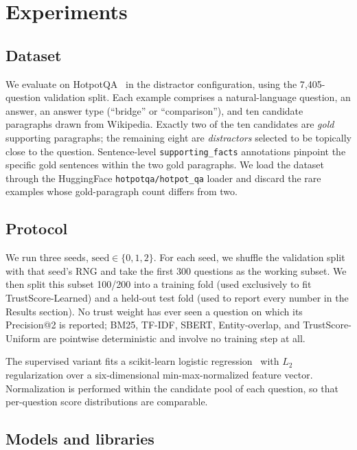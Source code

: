 \section{Experiments}
\label{sec:experiments}

\subsection{Dataset}

We evaluate on HotpotQA~\cite{yang2018hotpotqa} in the distractor
configuration, using the 7{,}405-question validation split. Each
example comprises a natural-language question, an answer, an answer
type (``bridge'' or ``comparison''), and ten candidate paragraphs drawn
from Wikipedia. Exactly two of the ten candidates are \emph{gold}
supporting paragraphs; the remaining eight are \emph{distractors}
selected to be topically close to the question. Sentence-level
\texttt{supporting\_facts} annotations pinpoint the specific gold
sentences within the two gold paragraphs. We load the dataset through
the HuggingFace \texttt{hotpotqa/hotpot\_qa} loader and discard the
rare examples whose gold-paragraph count differs from two.

\subsection{Protocol}

We run three seeds, $\text{seed}\in\{0,1,2\}$. For each seed, we
shuffle the validation split with that seed's RNG and take the first
300 questions as the working subset. We then split this subset
100/200 into a training fold (used exclusively to fit
TrustScore-Learned) and a held-out test fold (used to report every
number in the Results section). No trust weight has ever seen a
question on which its Precision@2 is reported; BM25, TF-IDF, SBERT,
Entity-overlap, and TrustScore-Uniform are pointwise deterministic and
involve no training step at all.

The supervised variant fits a scikit-learn logistic regression~\cite{pedregosa2011sklearn}
with $L_2$ regularization over a six-dimensional min-max-normalized
feature vector. Normalization is performed within the candidate pool
of each question, so that per-question score distributions are
comparable.

\subsection{Models and libraries}

